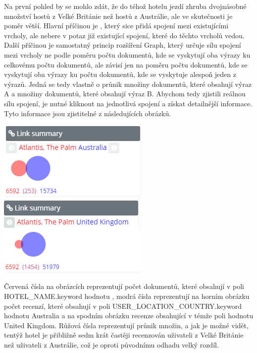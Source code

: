 \documentclass[czech,BP]{thesiskiv}
\begin{document}
 Na první pohled by se mohlo zdát, že do téhož hotelu jezdí zhruba dvojnásobné množství hostů z Velké Británie než hostů z Austrálie, ale ve skutečnosti je poměr větší. Hlavní příčinou je , který sice přidá spojení mezi existujícími vrcholy, ale nebere v potaz již existující spojení, které do těchto vrcholů vedou. Další příčinou je samostatný princip rozšíření Graph, který určuje sílu spojení mezi vrcholy ne podle poměru počtu dokumentů, kde se vyskytují oba výrazy ku celkovému počtu dokumentů, ale závisí jen na poměru počtu dokumentů, kde se vyskytují oba výrazy ku počtu dokumentů, kde se vyskytuje alespoň jeden z výrazů. Jedná se tedy vlastně o průnik množiny dokumentů, které obsahují výraz A a množiny dokumentů, které obsahují výraz B. Abychom tedy zjistili reálnou sílu spojení, je nutné kliknout na jednotlivá spojení a získat detailnější informace. Tyto informace jsou zjistitelné z následujících obrázků.\\
\begin{center}
	\includegraphics[scale=0.85]{img/AUS_atlantis.PNG}
	\hspace{0.4cm}
	\includegraphics[scale=0.85]{img/UK_atlantis.PNG}
\end{center}
 \noindent	
Červená čísla na obrázcích reprezentují počet dokumentů, které obsahují v poli HOTEL\_NAME.keyword hodnotu , modrá čísla reprezentují na horním obrázku počet recenzí, které obsahují v poli U\-SER\_LOCATION\_COUNTRY.keyword hodnotu Australia a na spodním obrázku recenze obsahující v témže poli hodnotu United Kingdom. Růžová čísla reprezentují průnik množin, a jak je možné vidět, tentýž hotel je přibližně sedm krát častěji recenzován uživateli z Velké Británie než uživateli z Austrálie, což je oproti původnímu odhadu velký rozdíl.
\end{document}
